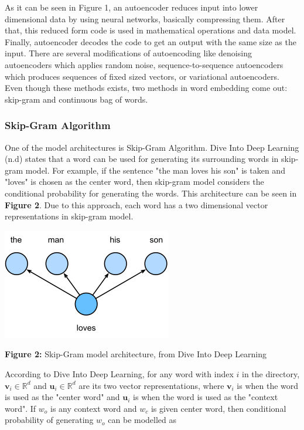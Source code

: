 \documentclass[man]{apa7}
\begin{document}
As it can be seen in Figure 1, an autoencoder reduces input into lower dimensional data by using neural networks, basically compressing them. After that, this reduced form code is used in mathematical operations and data model. Finally, autoencoder decodes the code to get an output with the same size as the input. There are several modifications of autoencoding like denoising autoencoders which applies random noise, sequence-to-sequence autoencoders which produces sequences of fixed sized vectors, or variational autoencoders. Even though these methods exists, two methods in word embedding come out: skip-gram and continuous bag of words.

\subsubsection{Skip-Gram Algorithm}

One of the model architectures is Skip-Gram Algorithm. Dive Into Deep Learning (n.d) states that a word can be used for generating its surrounding words in skip-gram model. For example, if the sentence "the man loves his son" is taken and "loves" is chosen as the center word, then skip-gram model considers the conditional probability for generating the words. This architecture can be seen in \textbf{Figure 2}. Due to this approach, each word has a two dimensional vector representations in skip-gram model. 

\begin{center}

\includegraphics[scale=1]{skip-gram.png}

\textbf{Figure 2:} Skip-Gram model architecture, from Dive Into Deep Learning\\[2\baselineskip]

\end{center}

According to Dive Into Deep Learning, for any word with index $\mathit{i}$ in the directory, $\mathbf{v_\mathit{i}} \in \mathbb{R}^d$ and $\mathbf{u_\mathit{i}} \in \mathbb{R}^d$ are its two vector representations, where $\mathbf{v_\mathit{i}}$ is when the word is used as the "center word" and $\mathbf{u_\mathit{i}}$ is when the word is used as the "context word". If $\mathit{w_o}$ is any context word and $\mathit{w_c}$ is given center word, then conditional probability of generating $\mathit{w_o}$ can be modelled as
\end{document}
